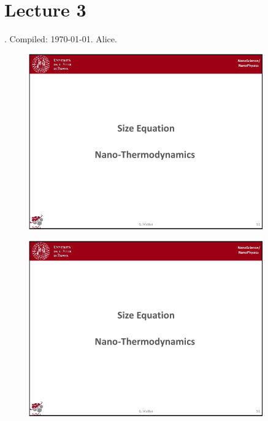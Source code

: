 \documentclass[../main/main.tex]{subfiles}
\begin{document}
\section{Lecture 3}
 . Compiled:  \today. Alice.


\begin{figure}[h!]
\centering
\includegraphics[page=1,width=0.9\textwidth]{../lessons/pdf_file/3_lesson.pdf}
\end{figure}

\begin{figure}[h!]
\centering
\includegraphics[page=2,width=0.9\textwidth]{../lessons/pdf_file/3_lesson.pdf}
\end{figure}
\end{document}
